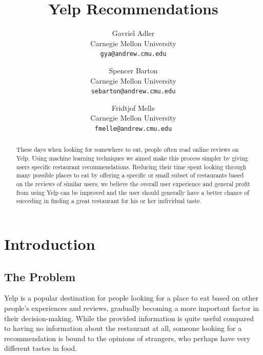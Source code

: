 \documentclass[10pt,twocolumn,letterpaper]{article}
\begin{document}
\title{Yelp Recommendations}

\author{
Gavriel Adler\\
Carnegie Mellon University\\
{\tt\small gya@andrew.cmu.edu}
\and
Spencer Barton\\
Carnegie Mellon University\\
{\tt\small sebarton@andrew.cmu.edu}
\and
Fridtjof Melle\\
Carnegie Mellon University\\
{\tt\small fmelle@andrew.cmu.edu}
}

\maketitle

\begin{abstract}
   These days when looking for somewhere to eat, people often read online reviews on Yelp. Using machine learning techniques we aimed make this process simpler by giving users specific restaurant recommendations. Reducing their time spent looking through many possible places to eat by offering a specific or small subset of restaurants based on the reviews of similar users, we believe the overall user experience and general profit from using Yelp can be improved and the user should generally have a better chance of succeding in finding a great restaurant for his or her individual taste.

   
\end{abstract}

\section{Introduction}

\subsection{The Problem}
Yelp is a popular destination for people looking for a place to eat based on other people's experiences and reviews, gradually becoming a more important factor in their decision-making. While the provided information is quite useful compared to having no information about the restaurant at all, someone looking for a recommendation is bound to the opinions of strangers, who perhaps have very different tastes in food.
\end{document}
